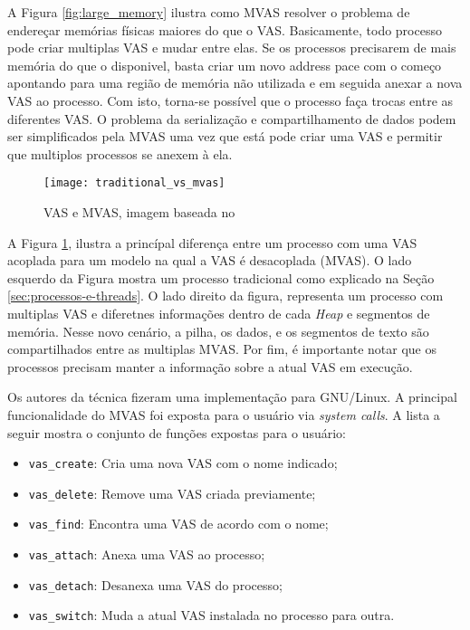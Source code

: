 A Figura \ref{fig:large_memory} ilustra como MVAS resolver o problema de
endereçar memórias físicas maiores do que o VAS. Basicamente, todo processo
pode criar multiplas VAS e mudar entre elas. Se os processos precisarem de mais
memória do que o disponivel, basta criar um novo address pace com o começo
apontando para uma região de memória não utilizada e em seguida anexar a nova
VAS ao processo. Com isto, torna-se possível que o processo faça trocas entre
as diferentes VAS. O problema da serialização e compartilhamento de dados podem
ser simplificados pela MVAS uma vez que está pode criar uma VAS e permitir que
multiplos processos se anexem à ela.

\begin{figure}[!h]
  \centering
  \texttt{[image: traditional\_vs\_mvas]} 
  \caption{VAS e MVAS, imagem baseada no \citep{spacejmp}}
  \label{fig:traditional_vs_mvas} 
\end{figure}

A Figura \ref{fig:traditional_vs_mvas}, ilustra a princípal diferença entre um
processo com uma VAS acoplada para um modelo na qual a VAS é desacoplada
(MVAS). O lado esquerdo da Figura mostra um processo tradicional como explicado
na Seção \ref{sec:processos-e-threads}. O lado direito da figura, representa um
processo com multiplas VAS e diferetnes informações dentro de cada \emph{Heap}
e segmentos de memória. Nesse novo cenário, a pilha, os dados, e os segmentos
de texto são compartilhados entre as multiplas MVAS. Por fim, é importante
notar que os processos precisam manter a informação sobre a atual VAS em
execução.
 
Os autores da técnica fizeram uma implementação para GNU/Linux. A principal
funcionalidade do MVAS foi exposta para o usuário via \emph{system calls}. A
lista a seguir mostra o conjunto de funções expostas para o usuário:

\begin{itemize}
  \item \texttt{vas\_create}: Cria uma nova VAS com o nome indicado;
  \item \texttt{vas\_delete}: Remove uma VAS criada previamente;
  \item \texttt{vas\_find}: Encontra uma VAS de acordo com o nome;
  \item \texttt{vas\_attach}: Anexa uma VAS ao processo;
  \item \texttt{vas\_detach}: Desanexa uma VAS do processo;
  \item \texttt{vas\_switch}: Muda a atual VAS instalada no processo para outra.
\end{itemize}

